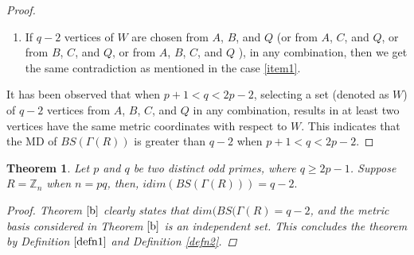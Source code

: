\documentclass[]{interact}
\theoremstyle{plain}%
\newtheorem{theorem}{Theorem}[section]
\theoremstyle{definition}
\theoremstyle{remark}
\begin{document}
\begin{proof}
\begin{enumerate}
\begin{itemize}
\begin{enumerate}
\begin{enumerate}
        \end{enumerate}
    \item  If only one set say, $B^{\nu_1}$  (or $C^{\nu_2}$), where $1\leq \nu_1,\nu_2 \leq \frac{p-1}{2}$, having one vertex of $W$, say $b^{\nu_1}_i$ and remaining sets have more than one or do not have any vertices of $W$, then we get the similar contradiction as mentioned in case \ref{item 9}
   \item If all sets $B^{\nu_1}$ and $C^{\nu_2}$ (Where $1\leq \nu_1,\nu_2 \leq \frac{p-1}{2})$ either contain more than one vertex of $W$ or do not contain any vertex of $W$, then we encounter the similar contradiction as mentioned in the case \ref{item 9}.
      \end{enumerate} 
 \end{itemize}
\item  If $q-2$ vertices of $W$ are chosen from $A$, $B$, and $Q$ (or from $A$, $C$, and $Q$, or from $B$, $C$, and $Q$, or from $A$, $B$, $C$, and $Q$ ), in any combination, then we get the same contradiction as mentioned in the case \ref{item1}.
\end{enumerate}
 It has been observed that when $p+1< q < 2p-2$, selecting a set (denoted as $W$) of $q-2$ vertices from $A$, $B$, $C$, and $Q$ in any combination, results in at least two vertices have the same metric coordinates with respect to $W$. This indicates that the MD of  $BS(\Gamma(R))$ is greater than $q-2$ when $p+1< q < 2p-2$.
 \end{proof}
 
\begin{theorem}
Let $p$ and $q$ be two distinct odd primes, where $q \geq 2p-1$. Suppose $R=\mathbb{Z}_n$ when $n=pq$, then,
$idim(BS(\Gamma(R))
)=q-2.$
\begin{proof}
Theorem $\ref{b}$ clearly states that $dim(BS(\Gamma(R)=q-2$, and the metric basis considered in Theorem $\ref{b}$ is an independent set. This concludes the theorem by Definition $\ref{defn1}$ and Definition \ref{defn2}.
\end{proof}
\end{theorem}
\end{document}

